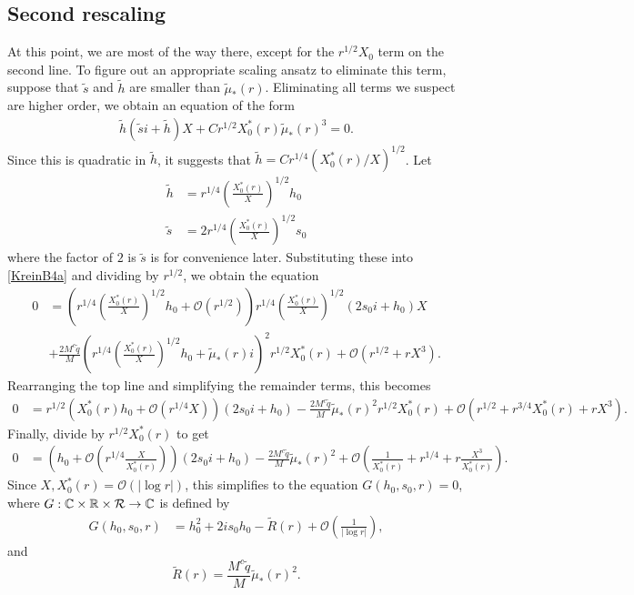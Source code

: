 \documentclass[thesis.tex]{subfiles}
\begin{document}
\subsection{Second rescaling}

At this point, we are most of the way there, except for the $r^{1/2}X_0$ term on the second line. To figure out an appropriate scaling ansatz to eliminate this term, suppose that $\tilde{s}$ and $\tilde{h}$ are smaller than $\tilde{\mu}_*(r)$. Eliminating all terms we suspect are higher order, we obtain an equation of the form
\begin{equation*}
\begin{aligned}
\tilde{h} (\tilde{s}i + \tilde{h}) X
+ C r^{1/2} X_0^*(r) \tilde{\mu}_*(r)^3 = 0.
\end{aligned}
\end{equation*} 
Since this is quadratic in $\tilde{h}$, it suggests that $\tilde{h} = C r^{1/4}(X_0^*(r)/X)^{1/2}$. Let
\begin{align*}
\tilde{h} &= r^{1/4}\left(\frac{X_0^*(r)}{X}\right)^{1/2} h_0 \\
\tilde{s} &= 2 r^{1/4}\left(\frac{X_0^*(r)}{X}\right)^{1/2} s_0
\end{align*}
where the factor of $2$ is $\tilde{s}$ is for convenience later. Substituting these into \cref{KreinB4a} and dividing by $r^{1/2}$, we obtain the equation
\begin{align*}
0 &= \left( r^{1/4}\left(\frac{X_0^*(r)}{X}\right)^{1/2} h_0 + \mathcal{O}( r^{1/2} )\right) r^{1/4}\left(\frac{X_0^*(r)}{X}\right)^{1/2} (2 s_0 i + h_0 )X  \\
&+\frac{2 M^c \tilde{q} }{M} \left( r^{1/4}\left(\frac{X_0^*(r)}{X}\right)^{1/2} h_0 + \tilde{\mu}_*(r) i \right)^2 r^{1/2} X_0^*(r) + \mathcal{O}(r^{1/2} + r X^3).
\end{align*}
Rearranging the top line and simplifying the remainder terms, this becomes
\begin{align*}
0 &= r^{1/2} \left( X_0^*(r) h_0 + \mathcal{O}( r^{1/4} X )\right) (2 s_0 i + h_0 ) -\frac{2 M^c \tilde{q} }{M} \tilde{\mu}_*(r)^2  r^{1/2} X_0^*(r) + \mathcal{O}\left(r^{1/2} + r^{3/4} X_0^*(r) + r X^3\right).
\end{align*}
Finally, divide by $r^{1/2}X_0^*(r)$ to get
\begin{align*}
0 &= \left( h_0 + \mathcal{O}\left( r^{1/4} \frac{X}{X_0^*(r)} \right)\right) (2 s_0 i + h_0 ) -\frac{2 M^c \tilde{q} }{M} \tilde{\mu}_*(r)^2 + \mathcal{O}\left(\frac{1}{X_0^*(r)} + r^{1/4} + r \frac{X^3}{X_0^*(r)} \right).
\end{align*}
Since $X, X_0^*(r) = \mathcal{O}(|\log r|)$, this simplifies to the equation $G(h_0, s_0, r) = 0$, where $G: \mathbb{C} \times \mathbb{R} \times \mathcal{R} \rightarrow \mathbb{C}$ is defined by
\begin{equation}\label{BsimpleG1}
\begin{aligned}
G(h_0, s_0, r) &= h_0^2 + 2 i s_0 h_0 - \tilde{R}(r) + \mathcal{O}\left( \frac{1}{|\log r|}\right),
\end{aligned}
\end{equation}
and
\[
\tilde{R}(r) = \frac{M^c \tilde{q} }{M} \tilde{\mu}_*(r)^2.
\]
\end{document}
